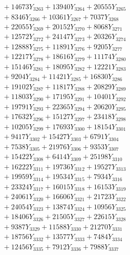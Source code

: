 \documentclass[a4paper,10pt]{article}
\begin{document}
{\begin{align}
&\;  + 14673 Y_{3263} + 13940 Y_{3264} + 20555 Y_{3265} \\[0.3ex]
&\;  + 8346 Y_{3266} + 10361 Y_{3267} + 7037 Y_{3268} \\[0.5ex]\allowbreak
&\;  + 22055 Y_{3269} + 20152 Y_{3270} + 8068 Y_{3271} \\[0.3ex]
&\;  + 12572 Y_{3272} + 24147 Y_{3273} + 20326 Y_{3274} \\[0.3ex]
&\;  + 12888 Y_{3275} + 11891 Y_{3276} + 9205 Y_{3277} \\[0.3ex]
&\;  + 12217 Y_{3278} + 18616 Y_{3279} + 11174 Y_{3280} \\[0.3ex]
&\;  + 15146 Y_{3281} + 18095 Y_{3282} + 12221 Y_{3283} \\[0.3ex]
&\;  + 9204 Y_{3284} + 11421 Y_{3285} + 16830 Y_{3286} \\[0.3ex]
&\;  + 19102 Y_{3287} + 11817 Y_{3288} + 20829 Y_{3289} \\[0.3ex]
&\;  + 11803 Y_{3290} + 17195 Y_{3291} + 10401 Y_{3292} \\[0.3ex]
&\;  + 19791 Y_{3293} + 22365 Y_{3294} + 20620 Y_{3295} \\[0.3ex]
&\;  + 17632 Y_{3296} + 15127 Y_{3297} + 23418 Y_{3298} \\[0.5ex]\allowbreak
&\;  + 10205 Y_{3299} + 17693 Y_{3300} + 18154 Y_{3301} \\[0.3ex]
&\;  + 9417 Y_{3302} + 15427 Y_{3303} + 6791 Y_{3304} \\[0.3ex]
&\;  + 7538 Y_{3305} + 21976 Y_{3306} + 9353 Y_{3307} \\[0.3ex]
&\;  + 15422 Y_{3308} + 6414 Y_{3309} + 25198 Y_{3310} \\[0.3ex]
&\;  + 16222 Y_{3311} + 19736 Y_{3312} + 19527 Y_{3313} \\[0.3ex]
&\;  + 19959 Y_{3314} + 19534 Y_{3315} + 7934 Y_{3316} \\[0.3ex]
&\;  + 23324 Y_{3317} + 16015 Y_{3318} + 16153 Y_{3319} \\[0.3ex]
&\;  + 24061 Y_{3320} + 16606 Y_{3321} + 21723 Y_{3322} \\[0.3ex]
&\;  + 24054 Y_{3323} + 13874 Y_{3324} + 10956 Y_{3325} \\[0.3ex]
&\;  + 18406 Y_{3326} + 21505 Y_{3327} + 22615 Y_{3328} \\[0.5ex]\allowbreak
&\;  + 9387 Y_{3329} + 11588 Y_{3330} + 21270 Y_{3331} \\[0.3ex]
&\;  + 18756 Y_{3332} + 13577 Y_{3333} + 7484 Y_{3334} \\[0.3ex]
&\;  + 12456 Y_{3335} + 7912 Y_{3336} + 7988 Y_{3337} \\[0.3ex]

\end{align}}
\end{document}
